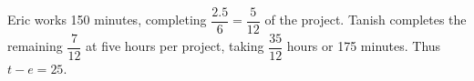 Eric works 150 minutes, completing $\dfrac{2.5}{6}=\dfrac{5}{12}$ of the project. Tanish completes the remaining $\dfrac{7}{12}$ at five hours per project, taking $\dfrac{35}{12}$ hours or 175 minutes. Thus $t-e=\boxed{25}$.
